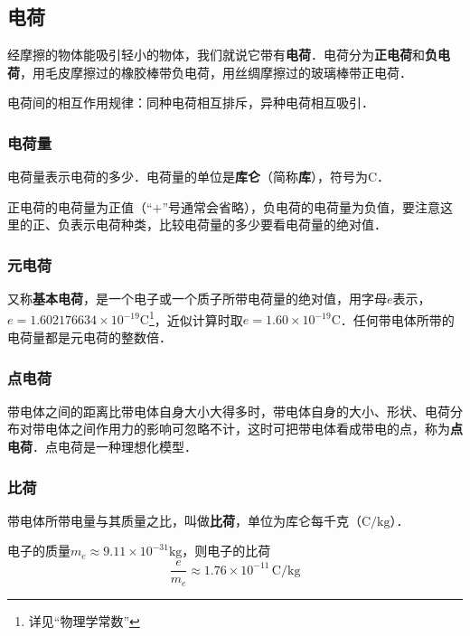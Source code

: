 
\subsection{电荷}

经摩擦的物体能吸引轻小的物体，我们就说它带有\textbf{电荷}．电荷分为\textbf{正电荷}和\textbf{负电荷}，用毛皮摩擦过的橡胶棒带负电荷，用丝绸摩擦过的玻璃棒带正电荷．

电荷间的相互作用规律：同种电荷相互排斥，异种电荷相互吸引．

\subsubsection{电荷量}

电荷量表示电荷的多少．电荷量的单位是\textbf{库仑}（简称\textbf{库}），符号为$\mathrm{C}$．

正电荷的电荷量为正值（“$+$”号通常会省略），负电荷的电荷量为负值，要注意这里的正、负表示电荷种类，比较电荷量的多少要看电荷量的绝对值．

\subsubsection{元电荷}

又称\textbf{基本电荷}，是一个电子或一个质子所带电荷量的绝对值，用字母$e$表示，$e = 1.602176634 \times 10^{-19} \mathrm{C}$\footnote{详见“物理学常数”}，近似计算时取$e = 1.60 \times 10^{-19} \mathrm{C}$．任何带电体所带的电荷量都是元电荷的整数倍．

\subsubsection{点电荷}

带电体之间的距离比带电体自身大小大得多时，带电体自身的大小、形状、电荷分布对带电体之间作用力的影响可忽略不计，这时可把带电体看成带电的点，称为\textbf{点电荷}．点电荷是一种理想化模型．

\subsubsection{比荷}

带电体所带电量与其质量之比，叫做\textbf{比荷}，单位为库仑每千克（$\mathrm{C/kg}$）．

电子的质量$m_e \approx 9.11 \times 10^{-31} \mathrm{kg}$，则电子的比荷
\begin{equation}
\frac{e}{m_e} \approx 1.76 \times 10^{-11} \,\mathrm{C/kg}
\end{equation}


